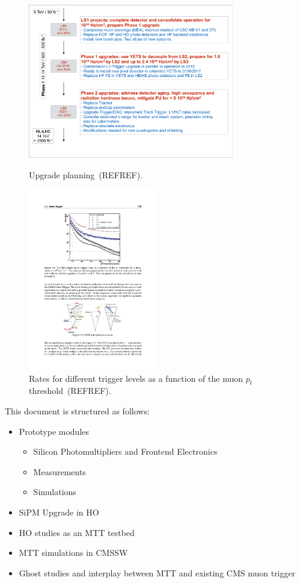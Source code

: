 \begin{figure}[htbp]
\centering
\includegraphics[width=0.8\textwidth]{Figures/pooth/upgrade_planning.pdf}\\
\caption{Upgrade planning~(REFREF).} 
\label{fig:upgrade_planning}
\end{figure}
\begin{figure}[htbp]
\centering
\includegraphics[width=0.5\textwidth]{Figures/pooth/pt_threshold.pdf}
\caption{Rates for different trigger levels as a function of the muon $p_t$ threshold~(REFREF).}
\label{fig:pt_threshold}
\end{figure}

This document is structured as follows:
\begin{itemize}
\item Prototype modules
	\begin{itemize}
	\item Silicon Photomultipliers and Frontend Electronics
	\item Measurements
	\item Simulations
	\end{itemize}
\item SiPM Upgrade in HO 
\item HO studies as an MTT testbed
\item MTT simulations in CMSSW
\item Ghost studies and interplay between MTT and existing CMS muon trigger
\end{itemize}